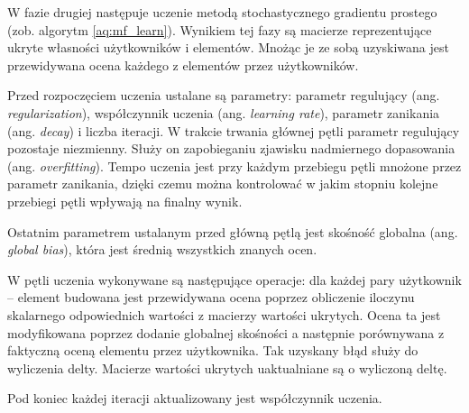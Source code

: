 \documentclass[twoside]{iisthesis}
\begin{document}
	 
	 W fazie drugiej następuje uczenie metodą stochastycznego gradientu prostego (zob. algorytm  \ref{aq:mf_learn}). Wynikiem tej fazy są macierze reprezentujące ukryte własności użytkowników i elementów. Mnożąc je ze sobą uzyskiwana jest przewidywana ocena każdego z elementów przez użytkowników. 
	 
	 Przed rozpoczęciem uczenia ustalane są parametry: parametr regulujący (ang. \textit{regularization}), współczynnik uczenia (ang. \textit{learning rate}), parametr zanikania (ang. \textit{decay}) i liczba iteracji. 	
	 W trakcie trwania głównej pętli parametr regulujący pozostaje niezmienny. Służy on zapobieganiu zjawisku nadmiernego dopasowania (ang. \textit{overfitting}). Tempo uczenia jest przy każdym przebiegu pętli mnożone przez parametr zanikania, dzięki czemu można kontrolować w jakim stopniu kolejne przebiegi pętli wpływają na finalny wynik. 
	 
	 Ostatnim parametrem ustalanym przed główną pętlą jest skośność globalna (ang. \textit{global bias}), która jest średnią wszystkich znanych ocen. 
	 
	 W pętli uczenia wykonywane są następujące operacje: dla każdej pary użytkownik -- element budowana jest przewidywana ocena poprzez obliczenie iloczynu skalarnego odpowiednich wartości z macierzy wartości ukrytych. Ocena ta jest modyfikowana poprzez dodanie globalnej skośności a następnie porównywana z faktyczną oceną elementu przez użytkownika. Tak uzyskany błąd służy do wyliczenia delty. Macierze wartości ukrytych uaktualniane są o wyliczoną deltę. 
	 
	 Pod koniec każdej iteracji aktualizowany jest współczynnik uczenia.
	 
\end{document}
